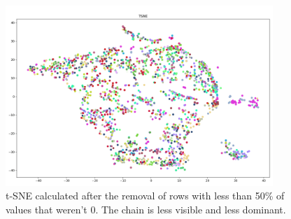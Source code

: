 \begin{figure}[h]
  \centering
  \includegraphics[width=0.9\textwidth]{./images/tsneAfterChainRemoved(50Percent).png}
  \caption{t-SNE calculated after the removal of rows with less than 50\% of values that weren't 0. The chain is less visible and less dominant.}
  \label{figure:tsneAfterChainRemoved(50Percent)}
\end{figure}








